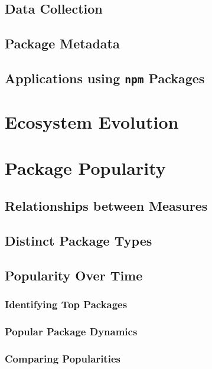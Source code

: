 \documentclass[10pt,conference]{IEEEtran}
\def\code#1{\texttt{#1}}
\begin{document}
\subsection{Data Collection}

\subsection{Package Metadata}

\subsection{Applications using \code{npm} Packages}

\section{Ecosystem Evolution}

\section{Package Popularity}

\subsection{Relationships between Measures}

\subsection{Distinct Package Types}

\subsection{Popularity Over Time}

\subsubsection{Identifying Top Packages}

\subsubsection{Popular Package Dynamics}

\subsubsection{Comparing Popularities}
\end{document}
